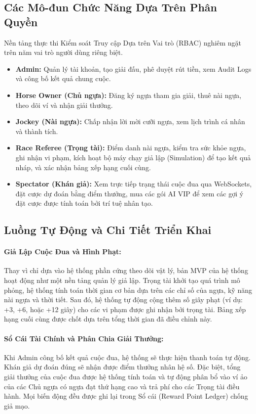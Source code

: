 \documentclass{llncs}
\begin{document}
\subsection{Các Mô-đun Chức Năng Dựa Trên Phân Quyền}
Nền tảng thực thi Kiểm soát Truy cập Dựa trên Vai trò (RBAC) nghiêm ngặt trên năm vai trò người dùng riêng biệt.
\begin{itemize}
    \item \textbf{Admin:} Quản lý tài khoản, tạo giải đấu, phê duyệt rút tiền, xem Audit Logs và công bố kết quả chung cuộc.
    \item \textbf{Horse Owner (Chủ ngựa):} Đăng ký ngựa tham gia giải, thuê nài ngựa, theo dõi ví và nhận giải thưởng.
    \item \textbf{Jockey (Nài ngựa):} Chấp nhận lời mời cưỡi ngựa, xem lịch trình cá nhân và thành tích.
    \item \textbf{Race Referee (Trọng tài):} Điểm danh nài ngựa, kiểm tra sức khỏe ngựa, ghi nhận vi phạm, kích hoạt bộ máy chạy giả lập (Simulation) để tạo kết quả nháp, và xác nhận bảng xếp hạng cuối cùng.
    \item \textbf{Spectator (Khán giả):} Xem trực tiếp trạng thái cuộc đua qua WebSockets, đặt cược dự đoán bằng điểm thưởng, mua các gói AI VIP để xem các gợi ý đặt cược được tính toán bởi trí tuệ nhân tạo.
\end{itemize}

\subsection{Luồng Tự Động và Chi Tiết Triển Khai}
\paragraph{Giả Lập Cuộc Đua và Hình Phạt:} Thay vì chỉ dựa vào hệ thống phần cứng theo dõi vật lý, bản MVP của hệ thống hoạt động như một nền tảng quản lý giả lập. Trọng tài khởi tạo quá trình mô phỏng, hệ thống tính toán thời gian cơ bản dựa trên các chỉ số của ngựa, kỹ năng nài ngựa và thời tiết. Sau đó, hệ thống tự động cộng thêm số giây phạt (ví dụ: +3, +6, hoặc +12 giây) cho các vi phạm được ghi nhận bởi trọng tài. Bảng xếp hạng cuối cùng được chốt dựa trên tổng thời gian đã điều chỉnh này.
\paragraph{Sổ Cái Tài Chính và Phân Chia Giải Thưởng:} Khi Admin công bố kết quả cuộc đua, hệ thống sẽ thực hiện thanh toán tự động. Khán giả dự đoán đúng sẽ nhận được điểm thưởng nhân hệ số. Đặc biệt, tổng giải thưởng của cuộc đua được hệ thống tính toán và tự động phân bổ vào ví ảo của các Chủ ngựa có ngựa đạt thứ hạng cao và trả phí cho các Trọng tài điều hành. Mọi biến động đều được ghi lại trong Sổ cái (Reward Point Ledger) chống giả mạo.
\end{document}
